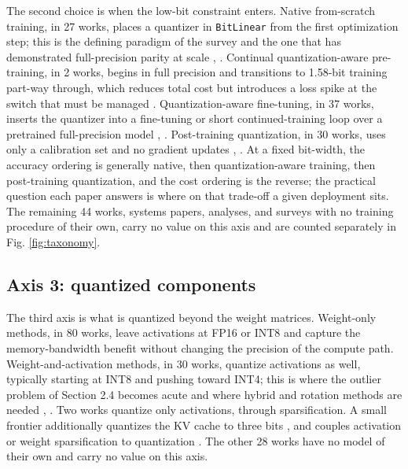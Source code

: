 \documentclass[11pt]{article}
\begin{document}
The second choice is when the low-bit constraint enters. Native from-scratch training,
in 27 works, places a quantizer in \texttt{BitLinear} from the first optimization step; this is
the defining paradigm of the survey and the one that has demonstrated full-precision
parity at scale \cite{Wang2023-BitNet,Ma2024-BitNetB158,Ma2025-BitNet2B4T},
\cite{Kaushal2024-Spectra}. Continual quantization-aware pre-training, in 2 works, begins in
full precision and transitions to 1.58-bit training part-way through, which reduces
total cost but introduces a loss spike at the switch that must be managed
\cite{Nielsen2025-ContinualQAT,Tu2025-Rethink1bitOpt}. Quantization-aware fine-tuning, in
37 works, inserts the quantizer into a fine-tuning or short continued-training loop over
a pretrained full-precision model \cite{Xu2024-OneBit,Du2024-BitDistiller},
\cite{Wu2025-BitNetDistillation}. Post-training quantization, in 30 works, uses only a
calibration set and no gradient updates \cite{Huang2024-BiLLM,Li2024-ARBLLM},
\cite{Xiao2025-PTQTP,Yan2025-PT2LLM,Xu2024-CRVQ,Edalati2024-OAC}. At a fixed
bit-width, the accuracy ordering is
generally native, then quantization-aware training, then post-training quantization,
and the cost ordering is the reverse; the practical question each paper answers is where
on that trade-off a given deployment sits. The remaining 44 works, systems papers,
analyses, and surveys with no training procedure of their own, carry no value on this
axis and are counted separately in Fig. \ref{fig:taxonomy}.

\subsection{Axis 3: quantized components}

The third axis is what is quantized beyond the weight matrices. Weight-only methods, in
80 works, leave activations at FP16 or INT8 and capture the memory-bandwidth benefit
without changing the precision of the compute path. Weight-and-activation methods, in 30
works, quantize activations as well, typically starting at INT8 and pushing toward INT4;
this is where the outlier problem of Section 2.4 becomes acute and where hybrid and
rotation methods are needed \cite{Wang2024-BitNetA48,Wang2025-BitNetV2,Zhao2026-TWLA},
\cite{Zhao2026-BWLA}. Two works quantize only activations, through sparsification. A small
frontier additionally quantizes the KV cache to three bits \cite{Wang2024-BitNetA48},
\cite{Wang2025-BitNetV2} and couples activation or weight sparsification to quantization
\cite{Wang2024-QSparse,Zhang2026-SparseBitNet,Huang2026-Sherry,Qi2025-DeltaLLM}. The
other 28 works have no model of their own and carry no value on this axis.
\end{document}
